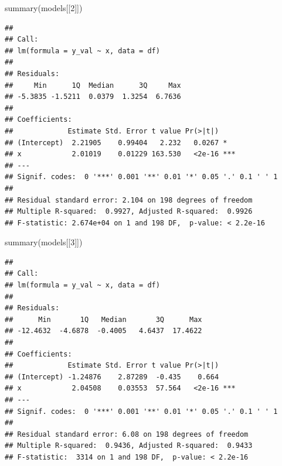 \documentclass[
]{book}
\newenvironment{Shaded}{\begin{snugshade}}{\end{snugshade}}
\newcommand{\AttributeTok}[1]{\textcolor[rgb]{0.77,0.63,0.00}{#1}}
\newcommand{\ControlFlowTok}[1]{\textcolor[rgb]{0.13,0.29,0.53}{\textbf{#1}}}
\newcommand{\DecValTok}[1]{\textcolor[rgb]{0.00,0.00,0.81}{#1}}
\newcommand{\FunctionTok}[1]{\textcolor[rgb]{0.00,0.00,0.00}{#1}}
\newcommand{\NormalTok}[1]{#1}
\newcommand{\OtherTok}[1]{\textcolor[rgb]{0.56,0.35,0.01}{#1}}
\newcommand{\SpecialCharTok}[1]{\textcolor[rgb]{0.00,0.00,0.00}{#1}}
\begin{document}
\begin{Shaded}
\end{Shaded}

\begin{Shaded}
\begin{Highlighting}[]
\FunctionTok{summary}\NormalTok{(models[[}\DecValTok{2}\NormalTok{]])}
\end{Highlighting}
\end{Shaded}

\begin{verbatim}
## 
## Call:
## lm(formula = y_val ~ x, data = df)
## 
## Residuals:
##     Min      1Q  Median      3Q     Max 
## -5.3835 -1.5211  0.0379  1.3254  6.7636 
## 
## Coefficients:
##             Estimate Std. Error t value Pr(>|t|)    
## (Intercept)  2.21905    0.99404   2.232   0.0267 *  
## x            2.01019    0.01229 163.530   <2e-16 ***
## ---
## Signif. codes:  0 '***' 0.001 '**' 0.01 '*' 0.05 '.' 0.1 ' ' 1
## 
## Residual standard error: 2.104 on 198 degrees of freedom
## Multiple R-squared:  0.9927, Adjusted R-squared:  0.9926 
## F-statistic: 2.674e+04 on 1 and 198 DF,  p-value: < 2.2e-16
\end{verbatim}

\begin{Shaded}
\begin{Highlighting}[]
\FunctionTok{summary}\NormalTok{(models[[}\DecValTok{3}\NormalTok{]])}
\end{Highlighting}
\end{Shaded}

\begin{verbatim}
## 
## Call:
## lm(formula = y_val ~ x, data = df)
## 
## Residuals:
##      Min       1Q   Median       3Q      Max 
## -12.4632  -4.6878  -0.4005   4.6437  17.4622 
## 
## Coefficients:
##             Estimate Std. Error t value Pr(>|t|)    
## (Intercept) -1.24876    2.87289  -0.435    0.664    
## x            2.04508    0.03553  57.564   <2e-16 ***
## ---
## Signif. codes:  0 '***' 0.001 '**' 0.01 '*' 0.05 '.' 0.1 ' ' 1
## 
## Residual standard error: 6.08 on 198 degrees of freedom
## Multiple R-squared:  0.9436, Adjusted R-squared:  0.9433 
## F-statistic:  3314 on 1 and 198 DF,  p-value: < 2.2e-16
\end{verbatim}
\end{document}
